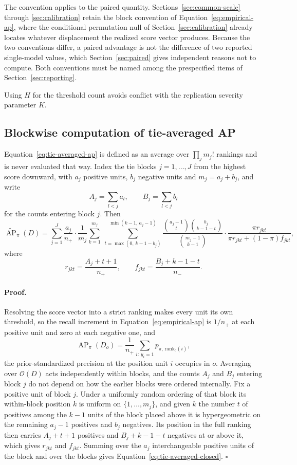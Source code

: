 \documentclass[11pt]{article}
\newcommand{\AP}{\operatorname{AP}}
\newcommand{\APta}{\widetilde{\AP}}
\theoremstyle{remark}
\begin{document}
The convention applies to the paired quantity. Sections~\ref{sec:common-scale} through \ref{sec:calibration} retain the block convention of Equation~\eqref{eq:empirical-ap}, where the conditional permutation null of Section~\ref{sec:calibration} already locates whatever displacement the realized score vector produces. Because the two conventions differ, a paired advantage is not the difference of two reported single-model values, which Section~\ref{sec:paired} gives independent reasons not to compute. Both conventions must be named among the prespecified items of Section~\ref{sec:reporting}.

Using $H$ for the threshold count avoids conflict with the replication severity parameter $K$.

\subsection{Blockwise computation of tie-averaged AP}
\label{app:tie-computation}

Equation~\eqref{eq:tie-averaged-ap} is defined as an average over $\prod_j m_j!$ rankings and is never evaluated that way. Index the tie blocks $j=1,\ldots,J$ from the highest score downward, with $a_j$ positive units, $b_j$ negative units and $m_j=a_j+b_j$, and write
\[
A_j=\sum_{l<j}a_l,
\qquad
B_j=\sum_{l<j}b_l
\]
for the counts entering block $j$. Then
\begin{equation}
\APta_\pi(D)
=
\sum_{j=1}^{J}
\frac{a_j}{n_+}
\cdot
\frac{1}{m_j}
\sum_{k=1}^{m_j}
\ \sum_{t=\max(0,\,k-1-b_j)}^{\min(k-1,\,a_j-1)}
\frac{\binom{a_j-1}{t}\binom{b_j}{k-1-t}}{\binom{m_j-1}{k-1}}
\cdot
\frac{\pi r_{jkt}}
{\pi r_{jkt}+(1-\pi)f_{jkt}},
\label{eq:tie-averaged-closed}
\end{equation}
where
\[
r_{jkt}=\frac{A_j+t+1}{n_+},
\qquad
f_{jkt}=\frac{B_j+k-1-t}{n_-}.
\]

\paragraph{Proof.}
Resolving the score vector into a strict ranking makes every unit its own threshold, so the recall increment in Equation~\eqref{eq:empirical-ap} is $1/n_+$ at each positive unit and zero at each negative one, and
\[
\AP_\pi(D_o)
=
\frac{1}{n_+}
\sum_{i:\,y_i=1}
p_{\pi,\,\mathrm{rank}_o(i)} ,
\]
the prior-standardized precision at the position unit $i$ occupies in $o$. Averaging over $\mathcal{O}(D)$ acts independently within blocks, and the counts $A_j$ and $B_j$ entering block $j$ do not depend on how the earlier blocks were ordered internally. Fix a positive unit of block $j$. Under a uniformly random ordering of that block its within-block position $k$ is uniform on $\{1,\ldots,m_j\}$, and given $k$ the number $t$ of positives among the $k-1$ units of the block placed above it is hypergeometric on the remaining $a_j-1$ positives and $b_j$ negatives. Its position in the full ranking then carries $A_j+t+1$ positives and $B_j+k-1-t$ negatives at or above it, which gives $r_{jkt}$ and $f_{jkt}$. Summing over the $a_j$ interchangeable positive units of the block and over the blocks gives Equation~\eqref{eq:tie-averaged-closed}. $\square$
\end{document}
